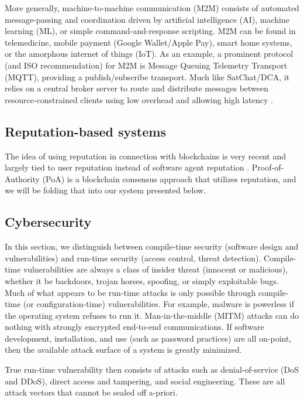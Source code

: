 \documentclass[10pt, twoside]{article}
\begin{document}
More generally, machine-to-machine communication (M2M) consists of automated message-passing and coordination driven by artificial intelligence (AI), machine learning (ML), or simple command-and-response scripting. M2M can be found in telemedicine, mobile payment (Google Wallet/Apple Pay), smart home systems, or the amorphous internet of things (IoT). As an example, a prominent protocol (and ISO recommendation) for M2M is Message Queuing Telemetry Transport (MQTT), providing a publish/subscribe transport. Much like SatChat/DCA, it relies on a central broker server to route and distribute messages between resource-constrained clients using low overhead and allowing high latency \cite{oasis2019mqtt}.


\subsection{Reputation-based systems}

The idea of using reputation in connection with blockchains is very recent and largely tied to user reputation instead of software agent reputation \cite{hasan2022privacy}. Proof-of-Authority (PoA) is a blockchain consensus approach that utilizes reputation, and we will be folding that into our system presented below.


\subsection{Cybersecurity} \label{cyber}

In this section, we distinguish between compile-time security (software design and vulnerabilities) and run-time security (access control, threat detection). Compile-time vulnerabilities are always a class of insider threat (innocent or malicious), whether it be backdoors, trojan horses, spoofing, or simply exploitable bugs. Much of what appears to be run-time attacks is only possible through compile-time (or configuration-time) vulnerabilities. For example, malware is powerless if the operating system refuses to run it. Man-in-the-middle (MITM) attacks can do nothing with strongly encrypted end-to-end communications. If software development, installation, and use (such as password practices) are all on-point, then the available attack surface of a system is greatly minimized.

True run-time vulnerability then consists of attacks such as denial-of-service (DoS and DDoS), direct access and tampering, and social engineering. These are all attack vectors that cannot be sealed off a-priori.
\end{document}
